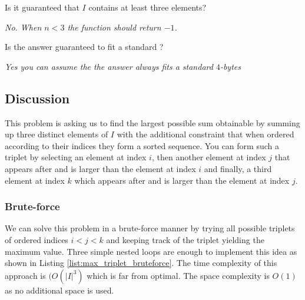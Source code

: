 \begin{QandA}
	\begin{questionitem} \begin{question} Is it guaranteed that $I$ contains at least three elements?  \end{question} 	 
    \begin{answered}
		\textit{No. When $n < 3$ the function should return $-1$.}
	\end{answered} \end{questionitem}
	\begin{questionitem} \begin{question} Is the answer guaranteed to fit a standard ?  \end{question} 	 
    \begin{answered}
		\textit{Yes you can assume the the answer always fits a standard $4$-bytes }
	\end{answered} \end{questionitem}
\end{QandA}

\subsection{Discussion}
\label{max_triplet:sec:discussion}
This problem is asking us to find the largest possible sum obtainable by summing up three distinct
elements of $I$ with the additional constraint that when ordered according to their indices they
form a sorted sequence. You can form such a triplet by selecting an element at index $i$, then
another element at index $j$ that appears after and is larger than the element at index $i$
and finally, a third element at index $k$ which appears after and is larger than the element at
index $j$.

\subsubsection{Brute-force}
\label{max_triplet:sec:bruteforce}
We can solve this problem in a brute-force manner by trying all possible triplets of
ordered indices $i < j <k$ and keeping track of the triplet yielding the maximum value. Three simple
nested loops are enough to implement this idea as shown in Listing
\ref{list:max_triplet_bruteforce}. The time complexity of this approach is $(O(|I|^3)$ which is far
from optimal. The space complexity is $O(1)$ as no additional space is used.




